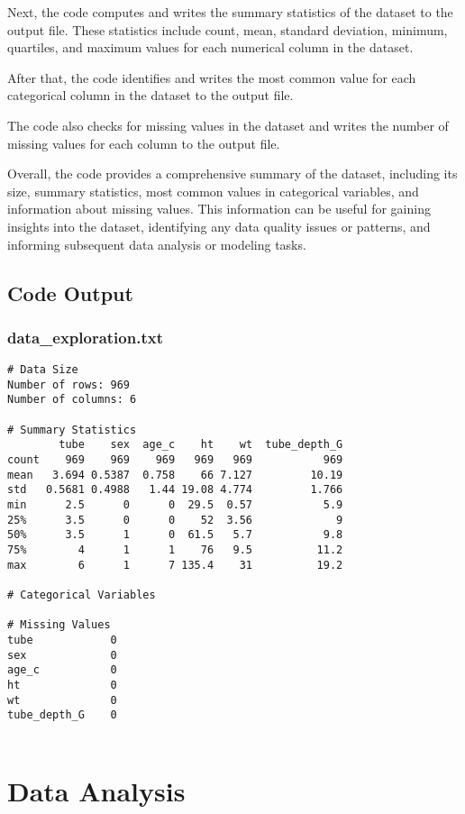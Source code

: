 \documentclass[11pt]{article}
\begin{document}
Next, the code computes and writes the summary statistics of the dataset to the output file. These statistics include count, mean, standard deviation, minimum, quartiles, and maximum values for each numerical column in the dataset.

After that, the code identifies and writes the most common value for each categorical column in the dataset to the output file.

The code also checks for missing values in the dataset and writes the number of missing values for each column to the output file.

Overall, the code provides a comprehensive summary of the dataset, including its size, summary statistics, most common values in categorical variables, and information about missing values. This information can be useful for gaining insights into the dataset, identifying any data quality issues or patterns, and informing subsequent data analysis or modeling tasks.

\subsection{Code Output}

\subsubsection*{data\_exploration.txt}

\begin{Verbatim}[tabsize=4]
# Data Size
Number of rows: 969
Number of columns: 6

# Summary Statistics
        tube    sex  age_c    ht    wt  tube_depth_G
count    969    969    969   969   969           969
mean   3.694 0.5387  0.758    66 7.127         10.19
std   0.5681 0.4988   1.44 19.08 4.774         1.766
min      2.5      0      0  29.5  0.57           5.9
25%      3.5      0      0    52  3.56             9
50%      3.5      1      0  61.5   5.7           9.8
75%        4      1      1    76   9.5          11.2
max        6      1      7 135.4    31          19.2

# Categorical Variables

# Missing Values
tube            0
sex             0
age_c           0
ht              0
wt              0
tube_depth_G    0


\end{Verbatim}

\section{Data Analysis}
\end{document}
